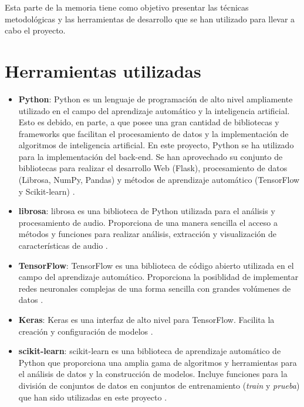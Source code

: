 
Esta parte de la memoria tiene como objetivo presentar las técnicas metodológicas y las herramientas de desarrollo que se han utilizado para llevar a cabo el proyecto.

\section{Herramientas utilizadas}
\begin{itemize}
\tightlist
\item \textbf{Python}: Python es un lenguaje de programación de alto nivel ampliamente utilizado en el campo del aprendizaje automático y la inteligencia artificial. Esto es debido, en parte, a que posee una gran cantidad de bibliotecas y frameworks que facilitan el procesamiento de datos y la implementación de algoritmos de inteligencia artificial.
En este proyecto, Python se ha utilizado para la implementación del back-end. Se han aprovechado su conjunto de bibliotecas para realizar el desarrollo Web (Flask), procesamiento de datos (Librosa, NumPy, Pandas) y métodos de aprendizaje automático (TensorFlow y Scikit-learn) \cite{3.10_Documentation}. 

\item \textbf{librosa}: librosa es una biblioteca de Python utilizada para el análisis y procesamiento de audio. Proporciona de una manera sencilla el acceso a métodos y funciones para realizar análisis, extracción y visualización de características de audio \cite{librosa}.

\item \textbf{TensorFlow}: TensorFlow es una biblioteca de código abierto utilizada en el campo del aprendizaje automático. Proporciona la posiblidad de implementar redes neuronales complejas de una forma sencilla con grandes volúmenes de datos \cite{TensorFlow}.

\item \textbf{Keras}: Keras es una interfaz de alto nivel para TensorFlow. Facilita la creación y configuración de modelos \cite{TensorFlow}. 

\item \textbf{scikit-learn}: scikit-learn es una biblioteca de aprendizaje automático de Python que proporciona una amplia gama de algoritmos y herramientas para el análisis de datos y la construcción de modelos. Incluye funciones para la división de conjuntos de datos en conjuntos de entrenamiento (\textit{train} y \textit{prueba}) que han sido utilizadas en este proyecto \cite{scikit}. 


\end{itemize}
